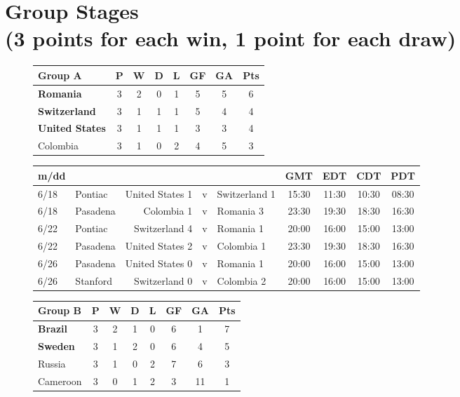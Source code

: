 \section{Group Stages \\ (3 points for each win, 1 point for each draw)}
\tiny
\begin{figure}[H]
\begin{tabular}{l*{7}{c}}
Group A & P & W & D & L & GF & GA & Pts \\ \hline
\textbf{Romania} & 3 & 2 & 0 & 1 & 5 & 5 & 6 \\
\textbf{Switzerland} & 3 & 1 & 1 & 1 & 5 & 4 & 4 \\
\textbf{United States} & 3 & 1 & 1 & 1 & 3 & 3 & 4 \\
Colombia & 3 & 1 & 0 & 2 & 4 & 5 & 3 \\ \hline
\end{tabular}
\end{figure}
\begin{figure}[H]
\begin{tabular}{l l r c l c c c c}
m/dd  & & & & & GMT & EDT & CDT & PDT \\ \hline
6/18 & Pontiac & United States  1 & v & Switzerland  1 & 15:30 & 11:30 & 10:30 & 08:30 \\
6/18 & Pasadena & Colombia  1 & v &  Romania  3 & 23:30 & 19:30 & 18:30 & 16:30 \\ 
6/22 & Pontiac & Switzerland 4 & v & Romania 1 & 20:00 &16:00 & 15:00 & 13:00 \\
6/22 & Pasadena & United States 2 & v & Colombia 1 &  23:30 & 19:30 & 18:30 & 16:30 \\
6/26 & Pasadena  & United States  0 & v & Romania 1 &  20:00 & 16:00 & 15:00 & 13:00 \\
6/26 & Stanford & Switzerland 0  & v & Colombia  2 & 20:00 & 16:00 & 15:00 & 13:00  \\ \hline
\end{tabular}
\end{figure}
\begin{figure}[H]
\begin{tabular}{l*{7}{c}}
Group B & P & W & D & L & GF & GA & Pts \\ \hline
\textbf{Brazil} & 3 & 2 & 1 & 0 & 6 & 1 & 7 \\
\textbf{Sweden} & 3 & 1 & 2 & 0 & 6 & 4 & 5 \\
Russia  & 3 & 1 & 0 & 2 & 7 & 6 & 3 \\
Cameroon & 3 & 0 & 1 & 2 & 3 & 11 & 1 \\ \hline
\end{tabular}
\end{figure}

